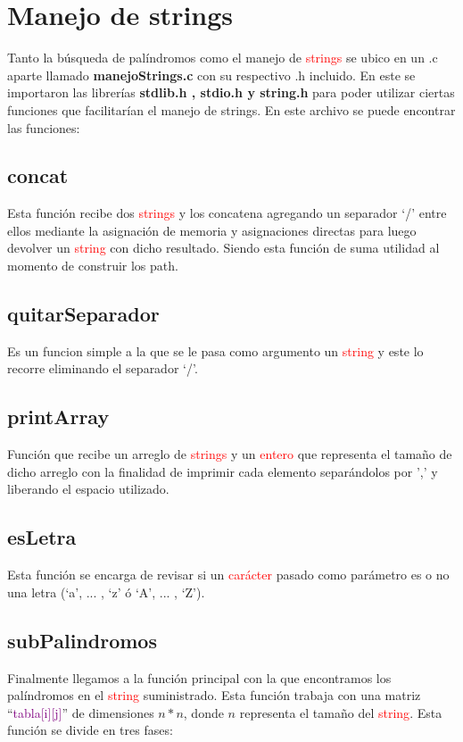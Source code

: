 \documentclass[12pt,letterpaper]{article}
\begin{document}
\section{Manejo de strings}
   Tanto la búsqueda de palíndromos como el manejo de \textcolor{red}{strings} se ubico en un .c aparte llamado \textbf{manejoStrings.c} con su respectivo .h incluido.
   En este se importaron las librerías \textbf{stdlib.h , stdio.h y string.h} para poder utilizar ciertas funciones que facilitarían el manejo de strings.
   En este archivo se puede encontrar las funciones:
   
\subsection{\large{concat}}
   Esta función recibe dos \textcolor{red}{strings} y los concatena agregando un separador `/' entre ellos
   mediante la asignación de memoria y asignaciones directas para luego devolver un \textcolor{red}{string} con dicho resultado. Siendo esta función de suma utilidad al momento de construir los path.
   
\subsection{\large{quitarSeparador}}
	Es un funcion simple a la que se le pasa como argumento un \textcolor{red}{string} y este lo recorre eliminando el separador `/'.

\subsection*{\large{printArray}}
   Función que recibe un arreglo de \textcolor{red}{strings} y un \textcolor{red}{entero} que representa el tamaño de dicho arreglo con la finalidad de imprimir cada elemento separándolos por ',' y liberando el espacio utilizado.

\subsection{\large{esLetra}}
   Esta función se encarga de revisar si un \textcolor{red}{carácter} pasado como parámetro es o no una letra (`a', ... , `z' ó `A', ... , `Z'). 

\subsection{\large{subPalindromos}}
   Finalmente llegamos a la función principal con la que encontramos los palíndromos en el \textcolor{red}{string} suministrado. Esta función trabaja con una matriz ``\textcolor{purple}{tabla[i][j]}'' de dimensiones $n*n$, donde $n$ representa el tamaño del \textcolor{red}{string}. Esta función se divide en tres fases:
\end{document}
